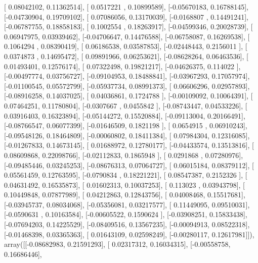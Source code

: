 \documentclass{article}
\begin{document}
       [ 0.08042102,  0.11362514],
       [ 0.0517221 ,  0.10899589],
       [-0.05670183,  0.16788145],
       [-0.04730904,  0.19709102],
       [ 0.07086056,  0.13170039],
       [-0.0168807 ,  0.14491241],
       [-0.06787755,  0.18858183],
       [ 0.1002554 ,  0.18263917],
       [-0.04599346,  0.20028739],
       [ 0.06947975,  0.03939462],
       [-0.04706647,  0.14476588],
       [-0.06758087,  0.16269538],
       [ 0.1064294 ,  0.08390419],
       [ 0.06186538,  0.03587853],
       [-0.02448443,  0.2156011 ],
       [ 0.0374873 ,  0.14695472],
       [ 0.09891966,  0.06253621],
       [-0.08628264,  0.06463536],
       [ 0.01493401,  0.12576174],
       [ 0.07322498,  0.19821217],
       [-0.04626375,  0.114022  ],
       [-0.00497774,  0.03756727],
       [-0.09104953,  0.18488841],
       [-0.03967293,  0.17057974],
       [-0.01100545,  0.05572799],
       [-0.05937734,  0.08991373],
       [ 0.06606296,  0.02957893],
       [-0.08916258,  0.14037025],
       [ 0.04036861,  0.1724788 ],
       [-0.00109092,  0.10064391],
       [ 0.07464251,  0.11780804],
       [-0.0307667 ,  0.0455842 ],
       [-0.08743447,  0.04533226],
       [ 0.03916403,  0.16323894],
       [-0.05144272,  0.15520884],
       [-0.09113004,  0.20166491],
       [-0.08766547,  0.06077399],
       [-0.01646509,  0.1821198 ],
       [ 0.0654915 ,  0.06910243],
       [-0.09548126,  0.18464809],
       [-0.00060802,  0.18411384],
       [ 0.07984304,  0.12316085],
       [-0.01267833,  0.14673145],
       [ 0.01688972,  0.12780177],
       [-0.04433574,  0.13513816],
       [ 0.08609868,  0.22098766],
       [-0.02112833,  0.1865948 ],
       [ 0.0291868 ,  0.07280976],
       [-0.09485446,  0.03245253],
       [-0.08676313,  0.07064727],
       [ 0.06015184,  0.08379112],
       [ 0.05561459,  0.12763595],
       [-0.0790834 ,  0.18221221],
       [ 0.08547387,  0.2152326 ],
       [ 0.04631492,  0.16535873],
       [ 0.01602313,  0.10037253],
       [ 0.113023  ,  0.03943798],
       [ 0.10449848,  0.07877989],
       [ 0.04212863,  0.12843756],
       [ 0.04008468,  0.15517681],
       [-0.03945737,  0.08034068],
       [-0.05356081,  0.03217577],
       [ 0.11449095,  0.09510031],
       [-0.0590631 ,  0.10163584],
       [-0.00605522,  0.1590624 ],
       [-0.03908251,  0.15833438],
       [-0.07694203,  0.14225529],
       [-0.08409516,  0.13567235],
       [-0.00094913,  0.08522318],
       [-0.01468398,  0.03365363],
       [ 0.01643109,  0.02598249],
       [-0.00280117,  0.12617981]]), array([[-0.08682983,  0.21591293],
       [ 0.02317312,  0.16034315],
       [-0.00558758,  0.16686446],
\end{document}
